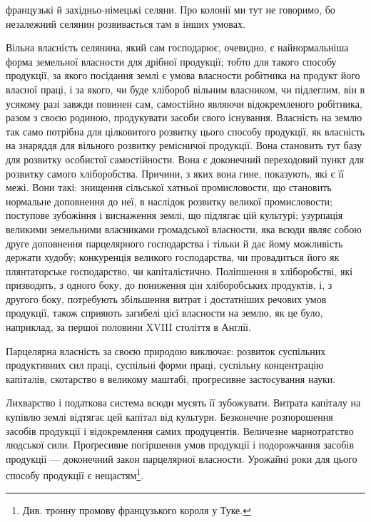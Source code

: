 \parcont{}  %
французькі й західньо-німецькі селяни. Про колонії ми тут не говоримо, бо
незалежний селянин розвивається там в інших умовах.

Вільна власність селянина, який сам господарює, очевидно, є найнормальніша
форма земельної власности для дрібної продукції; тобто для такого способу
продукції, за якого посідання землі є умова власности робітника на продукт
його власної праці, і за якого, чи буде хлібороб вільним власником, чи підлеглим,
він в усякому разі завжди повинен сам, самостійно являючи відокремленого
робітника, разом з своєю родиною, продукувати засоби свого існування. Власність
на землю так само потрібна для цілковитого розвитку цього способу продукції,
як власність на знаряддя для вільного розвитку ремісничої продукції. Вона
становить тут базу для розвитку особистої самостійности. Вона є доконечний
переходовий пункт для розвитку самого хліборобства. Причини, з яких вона
гине, показують, які є її межі. Вони такі: знищення сільської хатньої промисловости,
що становить нормальне доповнення до неї, в наслідок розвитку
великої промисловости; поступове зубожіння і виснаження землі, що підлягає
цій культурі; узурпація великими земельними власниками громадської власности,
яка всюди являє собою друге доповнення парцелярного господарства і
тільки й дає йому можливість держати худобу; конкуренція великого господарства,
чи провадиться його як плянтаторське господарство, чи капіталістично.
Поліпшення в хліборобстві, які призводять, з одного боку, до пониження цін
хліборобських продуктів, і, з другого боку, потребують збільшення витрат і
достатніших речових умов продукції, також сприяють загибелі цієї власности
на землю, як це було, наприклад, за першої половини XVIII століття в Англії.

Парцелярна власність за своєю природою виключає: розвиток суспільних
продуктивних сил праці, суспільні форми праці, суспільну концентрацію капіталів,
скотарство в великому маштабі, прогресивне застосування науки.

Лихварство і податкова система всюди мусять її зубожувати. Витрата капіталу
на купівлю землі відтягає цей капітал від культури. Безконечне розпорошення
засобів продукції і відокремлення самих продуцентів. Величезне марнотратство
людської сили. Проґресивне погіршення умов продукції і подорожчання
засобів продукції — доконечний закон парцелярної власности. Урожайні роки для
цього способу продукції є нещастям\footnote{
Див. тронну промову французького короля у Туке.
}.

